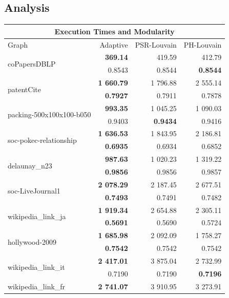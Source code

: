 \subsection{Analysis}
\begin{table}[t!]
	\centering
	\begin{tabular}{ |l||r||r|r|}
		\hline
		\multicolumn{4}{|c|}{Execution Times and Modularity} \\
		\hline
		Graph & Adaptive & PSR-Louvain & PH-Louvain \\
		\hline
		\multirow{ 2}{*}{coPapersDBLP}				& \textbf{369.14} 	&  419.59  	&  412.79 \\
													& 0.8543 	& 0.8544 	&  \textbf{0.8544} \\\hline
		\multirow{ 2}{*}{patentCite} 				& \textbf{1 660.79}	& 1 796.88 	& 2 555.14 \\
													& \textbf{0.7927}	& 0.7911   	& 0.7878 \\\hline
		\multirow{ 2}{*}{packing-500x100x100-b050}	& \textbf{993.35}    & 1 045.25 	& 1 090.03 \\
													& 0.9403	& \textbf{0.9434} 	& 0.9416 \\\hline
		\multirow{ 2}{*}{soc-pokec-relationship}	& \textbf{1 636.53}	& 1 843.95 	& 2 186.81 \\ 
													& \textbf{0.6935} 	& 0.6934 	& 0.6852 \\ \hline
		\multirow{ 2}{*}{delaunay\_n23 }			& \textbf{987.63} 	& 1 020.23 	& 1 319.22 \\
													& \textbf{0.9856} 	& 0.9856 	& 0.9857 \\\hline
		\multirow{ 2}{*}{soc-LiveJournal1}			& \textbf{2 078.29}  & 2 187.45 	& 2 677.51 \\
													& \textbf{0.7493} 	& 0.7491 	& 0.7482 \\\hline
		\multirow{ 2}{*}{wikipedia\_link\_ja} 		& \textbf{1 919.34}  & 2 654.88 	& 2 305.11 \\
													&\textbf{ 0.5691}	& 0.5690 	& 0.5724 \\\hline
		\multirow{ 2}{*}{hollywood-2009} 			& \textbf{1 685.98}	& 2 092.09 	& 1 758.27 \\
													& \textbf{0.7542} 	& 0.7542 	& 0.7542 \\\hline
		\multirow{ 2}{*}{wikipedia\_link\_it} 		&\textbf{ 2 417.01}	& 3 875.04 	& 2 732.99 \\
													& 0.7190	& 0.7190 	& \textbf{0.7196} \\\hline
		\multirow{ 2}{*}{wikipedia\_link\_fr} 		& \textbf{2 741.07} 	& 3 910.95 	& 3 273.91 \\

\end{tabular}
\end{table}
